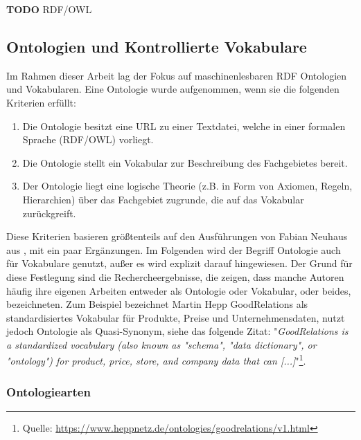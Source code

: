 \documentclass{article}
\begin{document}
\textbf{TODO}
RDF/OWL

\subsection{Ontologien und Kontrollierte Vokabulare}

Im Rahmen dieser Arbeit lag der Fokus auf maschinenlesbaren RDF Ontologien und Vokabularen.
Eine Ontologie wurde aufgenommen, wenn sie die folgenden Kriterien erfüllt:

\begin{enumerate}
    \item Die Ontologie besitzt eine URL zu einer Textdatei, welche in einer formalen Sprache (RDF/OWL) vorliegt.
    \item Die Ontologie stellt ein Vokabular zur Beschreibung des Fachgebietes bereit.
    \item Der Ontologie liegt eine logische Theorie (z.B. in Form von Axiomen, Regeln, Hierarchien) über das Fachgebiet zugrunde, die auf das Vokabular zurückgreift.
\end{enumerate}

Diese Kriterien basieren größtenteils auf den Ausführungen von Fabian Neuhaus aus \cite{neuhaus2018ontology}, mit ein paar Ergänzungen.
Im Folgenden wird der Begriff Ontologie auch für Vokabulare genutzt, außer es wird explizit darauf hingewiesen.
Der Grund für diese Festlegung sind die Rechercheergebnisse, die zeigen, dass manche Autoren häufig ihre eigenen Arbeiten entweder als Ontologie oder Vokabular, oder beides, bezeichneten.
Zum Beispiel bezeichnet Martin Hepp GoodRelations als standardisiertes Vokabular für Produkte, Preise und Unternehmensdaten, nutzt jedoch Ontologie als Quasi-Synonym, siehe das folgende Zitat: "\textit{GoodRelations is a standardized vocabulary (also known as "schema", "data dictionary", or "ontology") for product, price, store, and company data that can [...]}"\footnote{Quelle: \url{https://www.heppnetz.de/ontologies/goodrelations/v1.html}}.

\subsubsection{Ontologiearten}
\end{document}
